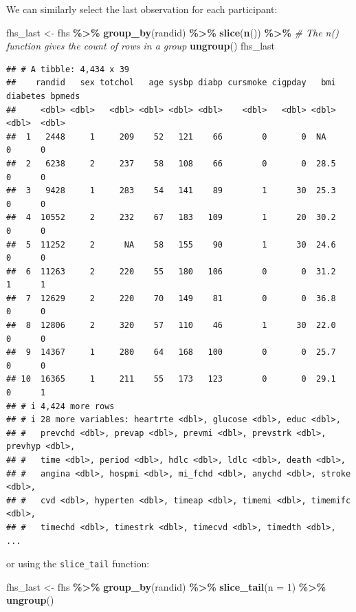 \documentclass[
]{book}
\newenvironment{Shaded}{\begin{snugshade}}{\end{snugshade}}
\newcommand{\AttributeTok}[1]{\textcolor[rgb]{0.13,0.29,0.53}{#1}}
\newcommand{\CommentTok}[1]{\textcolor[rgb]{0.56,0.35,0.01}{\textit{#1}}}
\newcommand{\DecValTok}[1]{\textcolor[rgb]{0.00,0.00,0.81}{#1}}
\newcommand{\FunctionTok}[1]{\textcolor[rgb]{0.13,0.29,0.53}{\textbf{#1}}}
\newcommand{\NormalTok}[1]{#1}
\newcommand{\OtherTok}[1]{\textcolor[rgb]{0.56,0.35,0.01}{#1}}
\newcommand{\SpecialCharTok}[1]{\textcolor[rgb]{0.81,0.36,0.00}{\textbf{#1}}}
\begin{document}
We can similarly select the last observation for each participant:

\begin{Shaded}
\begin{Highlighting}[]
\NormalTok{fhs\_last }\OtherTok{\textless{}{-}}\NormalTok{ fhs }\SpecialCharTok{\%\textgreater{}\%} 
  \FunctionTok{group\_by}\NormalTok{(randid) }\SpecialCharTok{\%\textgreater{}\%} 
  \FunctionTok{slice}\NormalTok{(}\FunctionTok{n}\NormalTok{()) }\SpecialCharTok{\%\textgreater{}\%} \CommentTok{\# The \textasciigrave{}n()\textasciigrave{} function gives the count of rows in a group }
  \FunctionTok{ungroup}\NormalTok{()}
\NormalTok{fhs\_last}
\end{Highlighting}
\end{Shaded}

\begin{verbatim}
## # A tibble: 4,434 x 39
##    randid   sex totchol   age sysbp diabp cursmoke cigpday   bmi diabetes bpmeds
##     <dbl> <dbl>   <dbl> <dbl> <dbl> <dbl>    <dbl>   <dbl> <dbl>    <dbl>  <dbl>
##  1   2448     1     209    52   121    66        0       0  NA          0      0
##  2   6238     2     237    58   108    66        0       0  28.5        0      0
##  3   9428     1     283    54   141    89        1      30  25.3        0      0
##  4  10552     2     232    67   183   109        1      20  30.2        0      0
##  5  11252     2      NA    58   155    90        1      30  24.6        0      0
##  6  11263     2     220    55   180   106        0       0  31.2        1      1
##  7  12629     2     220    70   149    81        0       0  36.8        0      0
##  8  12806     2     320    57   110    46        1      30  22.0        0      0
##  9  14367     1     280    64   168   100        0       0  25.7        0      0
## 10  16365     1     211    55   173   123        0       0  29.1        0      1
## # i 4,424 more rows
## # i 28 more variables: heartrte <dbl>, glucose <dbl>, educ <dbl>,
## #   prevchd <dbl>, prevap <dbl>, prevmi <dbl>, prevstrk <dbl>, prevhyp <dbl>,
## #   time <dbl>, period <dbl>, hdlc <dbl>, ldlc <dbl>, death <dbl>,
## #   angina <dbl>, hospmi <dbl>, mi_fchd <dbl>, anychd <dbl>, stroke <dbl>,
## #   cvd <dbl>, hyperten <dbl>, timeap <dbl>, timemi <dbl>, timemifc <dbl>,
## #   timechd <dbl>, timestrk <dbl>, timecvd <dbl>, timedth <dbl>, ...
\end{verbatim}

or using the \texttt{slice\_tail} function:

\begin{Shaded}
\begin{Highlighting}[]
\NormalTok{fhs\_last }\OtherTok{\textless{}{-}}\NormalTok{ fhs }\SpecialCharTok{\%\textgreater{}\%} 
  \FunctionTok{group\_by}\NormalTok{(randid) }\SpecialCharTok{\%\textgreater{}\%} 
  \FunctionTok{slice\_tail}\NormalTok{(}\AttributeTok{n =} \DecValTok{1}\NormalTok{) }\SpecialCharTok{\%\textgreater{}\%} 
  \FunctionTok{ungroup}\NormalTok{()}
\end{Highlighting}
\end{Shaded}
\end{document}
